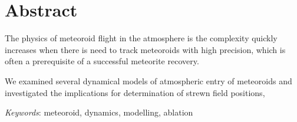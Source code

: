 \section*{Abstract}
    The physics of meteoroid flight in the atmosphere is 
    the complexity quickly increases when there is need to track meteoroids
    with high precision, which is often a prerequisite of a successful
    meteorite recovery.

    We examined several dynamical models of atmospheric entry of meteoroids
    and investigated the implications for determination of strewn field positions,


    \emph{Keywords}: meteoroid, dynamics, modelling, ablation
